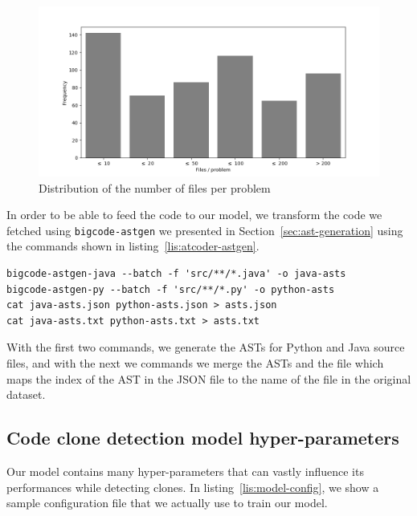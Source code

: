 \begin{figure}
  \begin{center}
    \includegraphics[width=16cm]{./images/code-clone-dataset-problems-distribution.png}
    \caption{\label{fig:files-per-problem-distribution} Distribution of the
      number of files per problem}
  \end{center}
\end{figure}

In order to be able to feed the code to our model, we transform the code we
fetched using \lstinline{bigcode-astgen} we presented in
Section~\ref{sec:ast-generation} using the commands shown in
listing~\ref{lis:atcoder-astgen}.

\begin{lstlisting}[numbers=none,language={},
  caption=AST generation using \lstinline{bigcode-astgen}, label=lis:atcoder-astgen]
bigcode-astgen-java --batch -f 'src/**/*.java' -o java-asts
bigcode-astgen-py --batch -f 'src/**/*.py' -o python-asts
cat java-asts.json python-asts.json > asts.json
cat java-asts.txt python-asts.txt > asts.txt
\end{lstlisting}
With the first two commands, we generate the ASTs for Python and Java source
files, and with the next we commands we merge the ASTs and the file which maps
the index of the AST in the JSON file to the name of the file in the original
dataset.
\subsection{\label{ssec:clone-detection-hyper-params}Code clone detection model hyper-parameters}
Our model contains many hyper-parameters that can vastly influence its
performances while detecting clones. In listing~\ref{lis:model-config}, we show a
sample configuration file that we actually use to train our model.

\begin{figure}
  
\end{figure}

